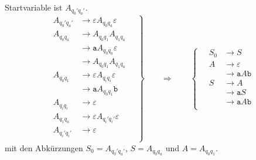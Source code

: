 \begin{loesung}
Startvariable ist $A_{q_0'q_a'}$.
\[
\left.
\begin{aligned}
A_{q_0'q_a'} & \to \varepsilon A_{q_0q_a}\varepsilon  \\
A_{q_0q_a}   & \to A_{q_0q_1}A_{q_1q_a} \\
             & \to \texttt{a} A_{q_0q_a}\varepsilon \\
             & \to A_{q_0q_1} A_{q_1q_a} \\
A_{q_0q_1}   & \to \varepsilon A_{q_iq_i}\varepsilon  \\
             & \to \texttt{a} A_{q_0q_1} \texttt{b} \\
A_{q_iq_i}   & \to \varepsilon \\
A_{q_1q_a}   & \to \varepsilon A_{q_i'q_i'}\varepsilon  \\
A_{q_i'q_i'} & \to \varepsilon \\
\end{aligned}
\quad
\right\}
\qquad\Rightarrow\qquad
\left\{
\quad
\begin{aligned}
S_0 & \to S \\
A   & \to \varepsilon \\
    & \to \texttt{a} A \texttt{b} \\
S   & \to A \\
    & \to \texttt{a} S  \\
    & \to \texttt{a} A \texttt{b} \\
\end{aligned}
\right.
\]
mit den Abkürzungen $S_0=A_{q_0'q_a'}$, $S=A_{q_0q_a}$ und $A=A_{q_0q_1}$.
\end{loesung}



